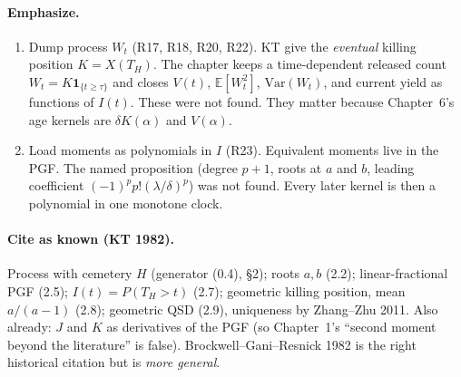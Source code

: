 \documentclass[11pt,a4paper]{report}
\begin{document}
\paragraph{Emphasize.}
\begin{enumerate}
\item Dump process \(W_t\) (R17, R18, R20, R22). KT give the
  \emph{eventual} killing position \(K=X(T_H)\). The chapter keeps a
  time-dependent released count \(W_t=K\mathbf{1}_{\{t\ge\tau\}}\) and
  closes \(V(t)\), \(\mathbb{E}[W_t^2]\), \(\mathrm{Var}(W_t)\), and
  current yield as functions of \(I(t)\). These were not found. They
  matter because Chapter~6's age kernels are \(\delta K(\alpha)\) and
  \(V(\alpha)\).
\item Load moments as polynomials in \(I\) (R23). Equivalent moments live
  in the PGF. The named proposition (degree \(p+1\), roots at \(a\) and
  \(b\), leading coefficient \((-1)^p p!(\lambda/\delta)^p\)) was not
  found. Every later kernel is then a polynomial in one monotone clock.
\end{enumerate}

\paragraph{Cite as known (KT 1982).}
Process with cemetery \(H\) (generator (0.4), §2); roots \(a,b\) (2.2);
linear-fractional PGF (2.5); \(I(t)=P(T_H>t)\) (2.7); geometric killing
position, mean \(a/(a-1)\) (2.8); geometric QSD (2.9), uniqueness by
Zhang--Zhu 2011. Also already: \(J\) and \(K\) as derivatives of the PGF
(so Chapter~1's ``second moment beyond the literature'' is false).
Brockwell--Gani--Resnick 1982 is the right historical citation but is
\emph{more general}.
\end{document}
